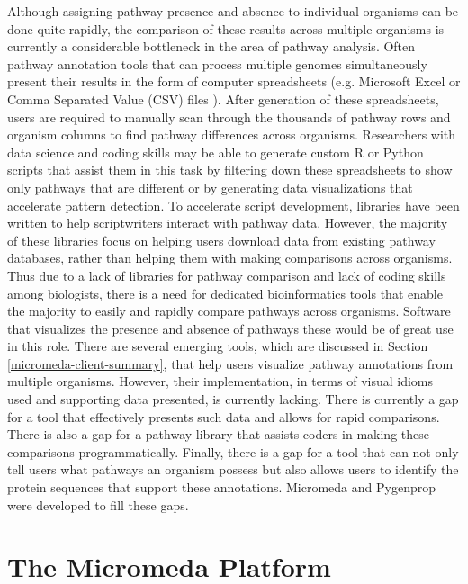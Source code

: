 Although assigning pathway presence and absence to individual organisms can be done quite rapidly, the comparison of these results across multiple organisms is currently a considerable bottleneck in the area of pathway analysis. Often pathway annotation tools that can process multiple genomes simultaneously present their results in the form of computer spreadsheets (e.g. Microsoft Excel or Comma Separated Value (CSV) files \cite{RFC4180}). After generation of these spreadsheets, users are required to manually scan through the thousands of pathway rows and organism columns to find pathway differences across organisms. Researchers with data science and coding skills may be able to generate custom R or Python scripts that assist them in this task by filtering down these spreadsheets to show only pathways that are different or by generating data visualizations that accelerate pattern detection. To accelerate script development, libraries have been written to help scriptwriters interact with pathway data. However, the majority of these libraries focus on helping users download data from existing pathway databases, rather than helping them with making comparisons across organisms. Thus due to a lack of libraries for pathway comparison and lack of coding skills among biologists, there is a need for dedicated bioinformatics tools that enable the majority to easily and rapidly compare pathways across organisms. Software that visualizes the presence and absence of pathways these would be of great use in this role. There are several emerging tools, which are discussed in Section \ref{micromeda-client-summary}, that help users visualize pathway annotations from multiple organisms. However, their implementation, in terms of visual idioms used and supporting data presented, is currently lacking. There is currently a gap for a tool that effectively presents such data and allows for rapid comparisons. There is also a gap for a pathway library that assists coders in making these comparisons programmatically. Finally, there is a gap for a tool that can not only tell users what pathways an organism possess but also allows users to identify the protein sequences that support these annotations. Micromeda and Pygenprop were developed to fill these gaps.

\section{The Micromeda Platform} \label{micromeda-overview}


